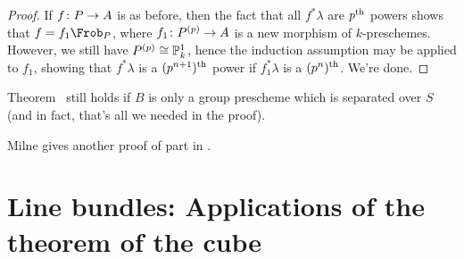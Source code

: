 \documentclass[a4paper,parskip=half,numbers=enddot, DIV=12]{scrreprt}
\begin{document}
\begin{proof}
	If $f\colon P\morphism A$ is as before, then the fact that all $f^*\lambda$ are $p^{\text{th}}$ powers shows that $f=f_1\Frob_P$, where $f_1\colon P^{(p)}\morphism A$ is  a new morphism of $k$-preschemes. However, we still have $P^{(p)}\cong \mathbb{P}_k^1$, hence the induction assumption may be applied to $f_1$, showing that $f^*\lambda$ is a $(p^{n+1})^{\text{th}}$ power if $f_1^*\lambda$ is a $(p^n)^{\text{th}}$. We're done.
\end{proof}
\begin{rem}
	\begin{alphanumerate}
		\item Theorem~ still holds if $B$ is only a group prescheme which is separated over $S$ (and in fact, that's all we needed in the proof).
		\item Milne gives another proof of part  in \cite{cornell1986arithmetic}.
	\end{alphanumerate}
\end{rem}

\section{Line bundles: Applications of the theorem of the cube}
\end{document}
